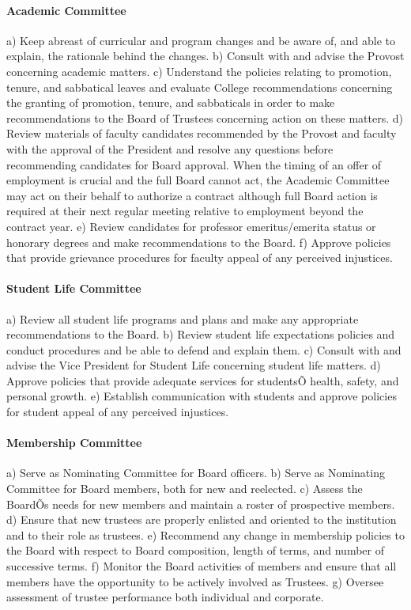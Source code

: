 \documentclass[letterpaper, 11pt]{article}
\begin{document}
			\paragraph{Academic Committee}
				a) Keep abreast of curricular and program changes and be aware of, and able to explain, the rationale behind the changes.
				b) Consult with and advise the Provost concerning academic matters.
				c) Understand the policies relating to promotion, tenure, and sabbatical leaves and evaluate College recommendations concerning the granting of promotion, tenure, and sabbaticals in order to make recommendations to the Board of Trustees concerning action on these matters.
				d) Review materials of faculty candidates recommended by the Provost and faculty with the approval of the President and resolve any questions before recommending candidates for Board approval.  When the timing of an offer of employment is crucial and the full Board cannot act, the Academic Committee may act on their behalf to authorize a contract although full Board action is required at their next regular meeting relative to employment beyond the contract year.
				e) Review candidates for professor emeritus/emerita status or honorary degrees and make recommendations to the Board.
				f) Approve policies that provide grievance procedures for faculty appeal of any perceived injustices.
			\paragraph{Student Life Committee}
				a) Review all student life programs and plans and make any appropriate recommendations to the Board.
				b) Review student life expectations policies and conduct procedures and be able to defend and explain them.
				c) Consult with and advise the Vice President for Student Life concerning student life matters.
				d) Approve policies that provide adequate services for studentsÕ health, safety, and personal growth.
				e) Establish communication with students and approve policies for student appeal of any perceived injustices.
			\paragraph{Membership Committee}
				a) Serve as Nominating Committee for Board officers.
				b) Serve as Nominating Committee for Board members, both for new and reelected.
				c) Assess the BoardÕs needs for new members and maintain a roster of prospective members.
				d) Ensure that new trustees are properly enlisted and oriented to the institution and to their role as trustees.
				e) Recommend any change in membership policies to the Board with respect to Board composition, length of terms, and number of successive terms.
				f) Monitor the Board activities of members and ensure that all members have the opportunity to be actively involved as Trustees.
				g) Oversee assessment of trustee performance both individual and corporate.
\end{document}
